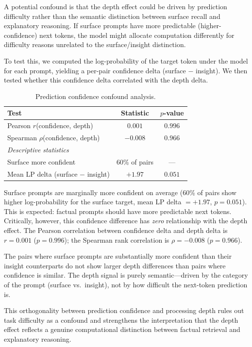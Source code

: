 \documentclass[10pt]{article}
\begin{document}
A potential confound is that the depth effect could be driven by prediction difficulty rather than the semantic distinction between surface recall and explanatory reasoning. If surface prompts have more predictable (higher-confidence) next tokens, the model might allocate computation differently for difficulty reasons unrelated to the surface/insight distinction.

To test this, we computed the log-probability of the target token under the model for each prompt, yielding a per-pair confidence delta (surface $-$ insight). We then tested whether this confidence delta correlated with the depth delta.

\begin{table}[h]
\centering
\caption{Prediction confidence confound analysis.}
\label{tab:confound}
\begin{tabular}{lcc}
\toprule
\textbf{Test} & \textbf{Statistic} & \textbf{$p$-value} \\
\midrule
Pearson $r$(confidence, depth) & $0.001$ & $0.996$ \\
Spearman $\rho$(confidence, depth) & $-0.008$ & $0.966$ \\
\midrule
\multicolumn{3}{l}{\textit{Descriptive statistics}} \\
\midrule
Surface more confident & 60\% of pairs & --- \\
Mean LP delta (surface $-$ insight) & $+1.97$ & $0.051$ \\
\bottomrule
\end{tabular}
\end{table}

Surface prompts are marginally more confident on average (60\% of pairs show higher log-probability for the surface target, mean LP delta $= +1.97$, $p = 0.051$). This is expected: factual prompts should have more predictable next tokens. Critically, however, this confidence difference has \textit{zero} relationship with the depth effect. The Pearson correlation between confidence delta and depth delta is $r = 0.001$ ($p = 0.996$); the Spearman rank correlation is $\rho = -0.008$ ($p = 0.966$).

The pairs where surface prompts are substantially more confident than their insight counterparts do not show larger depth differences than pairs where confidence is similar. The depth signal is purely semantic---driven by the category of the prompt (surface vs.\ insight), not by how difficult the next-token prediction is.

This orthogonality between prediction confidence and processing depth rules out task difficulty as a confound and strengthens the interpretation that the depth effect reflects a genuine computational distinction between factual retrieval and explanatory reasoning.
\end{document}
